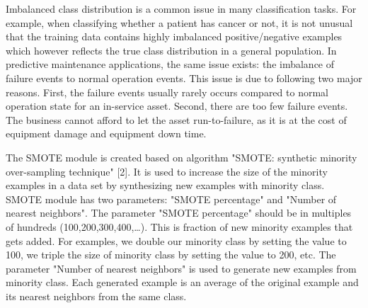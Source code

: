 Imbalanced class distribution is a common issue in many classification tasks. For example, when classifying whether a patient has cancer or not, it is not unusual that the training data contains highly imbalanced positive/negative examples which however reflects the true class distribution in a general population. In predictive maintenance applications, the same issue exists: the imbalance of failure events to normal operation events. This issue is due to following two major reasons. First, the failure events usually rarely occurs compared to normal operation state for an in-service asset. Second, there are too few failure events. The business cannot afford to let the asset run-to-failure, as it is at the cost of equipment damage and equipment down time.

The SMOTE module is created based on algorithm "SMOTE: synthetic minority over-sampling technique" [2]. It is used to increase the size of the minority examples in a data set by synthesizing new examples with minority class. SMOTE module has two parameters: "SMOTE percentage" and "Number of nearest neighbors". The parameter "SMOTE percentage" should be in multiples of hundreds (100,200,300,400,…). This is fraction of new minority examples that gets added. For examples, we double our minority class by setting the value to 100, we triple the size of minority class by setting the value to 200, etc. The parameter "Number of nearest neighbors" is used to generate new examples from minority class. Each generated example is an average of the original example and its nearest neighbors from the same class.